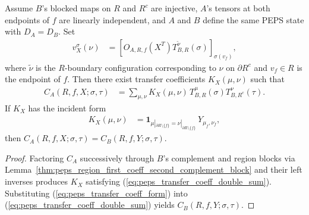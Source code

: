 \begin{lemma}
    \label{thm:peps_region_transfer_coeff_double_factorization}
    \leanok
    Assume $B$'s blocked maps on $R$ and $R^c$ are injective, $A$'s tensors at both endpoints of $f$ are linearly independent, and $A$ and $B$ define the same PEPS state with $D_A=D_B$. Set
    \begin{align}
        v_X^\sigma(\nu)
         & =
        \left[O_{A,R,f}(X^T)
            T_{B,R}^{\widetilde{\nu}}(\sigma)\right]_{\sigma(v_f)},
        \label{eq:peps_v_side_row}
    \end{align}
    where $\widetilde{\nu}$ is the $R$-boundary configuration corresponding to $\nu$ on $\partial R^c$ and $v_f\in R$ is the endpoint of $f$. Then there exist transfer coefficients $K_X(\mu,\nu)$ such that
    \begin{align}
        C_A(R,f,X;\sigma,\tau)
         & =
        \sum_{\mu,\nu}
        K_X(\mu,\nu)\,T_{B,R}^{\mu}(\sigma)
        T_{B,R^c}^{\nu}(\tau).
        \label{eq:peps_transfer_coeff_double_sum}
    \end{align}
    If $K_X$ has the incident form
    \begin{align}
        K_X(\mu,\nu)
         & =
        \mathbf 1_{
                \mu|_{\partial R\setminus\{f\}}
                =
                \nu|_{\partial R\setminus\{f\}}
            }\,Y_{\mu_f,\nu_f},
        \label{eq:peps_transfer_coeff_form}
    \end{align}
    then $C_A(R,f,X;\sigma,\tau)=C_B(R,f,Y;\sigma,\tau)$.
\end{lemma}
\begin{proof}\leanok
    Factoring $C_A$ successively through $B$'s complement and region blocks via Lemma~\ref{thm:peps_region_first_coeff_second_complement_block} and their left inverses produces $K_X$ satisfying (\ref{eq:peps_transfer_coeff_double_sum}). Substituting (\ref{eq:peps_transfer_coeff_form}) into (\ref{eq:peps_transfer_coeff_double_sum}) yields $C_B(R,f,Y;\sigma,\tau)$.
\end{proof}

